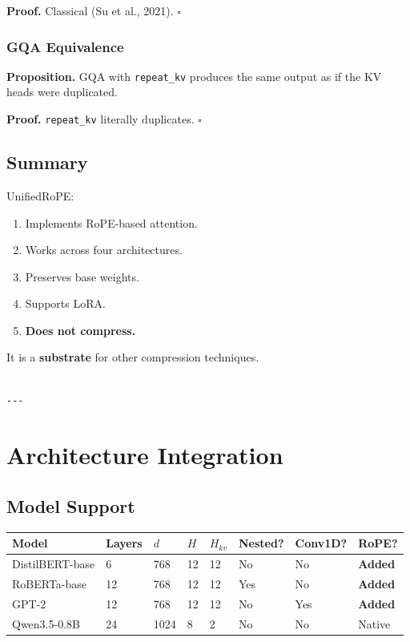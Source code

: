 {\textbf{Proof.} Classical (Su et al., 2021). $\square$

\subsubsection{GQA Equivalence}

\textbf{Proposition.} GQA with \texttt{repeat\_kv} produces the same output as if the 
KV heads were duplicated.

\textbf{Proof.} \texttt{repeat\_kv} literally duplicates. $\square$

\subsection{Summary}

UnifiedRoPE:
\begin{enumerate}
\item Implements RoPE-based attention.
\item Works across four architectures.
\item Preserves base weights.
\item Supports LoRA.
\item \textbf{Does not compress.}

\end{enumerate}
It is a \textbf{substrate} for other compression techniques.
\begin{lstlisting}

---
\end{lstlisting}


\section{Architecture Integration}

\subsection{Model Support}

\begin{table}[H]
\centering
\small
\begin{tabular}{llllllll}
\toprule
\textbf{Model} & \textbf{Layers} & \textbf{$d$} & \textbf{$H$} & \textbf{$H_{kv}$} & \textbf{Nested?} & \textbf{Conv1D?} & \textbf{RoPE?} \\
\midrule
DistilBERT-base & 6 & 768 & 12 & 12 & No & No & \textbf{Added} \\
RoBERTa-base & 12 & 768 & 12 & 12 & Yes & No & \textbf{Added} \\
GPT-2 & 12 & 768 & 12 & 12 & No & Yes & \textbf{Added} \\
Qwen3.5-0.8B & 24 & 1024 & 8 & 2 & No & No & Native \\
\bottomrule
\end{tabular}
\end{table}

}
